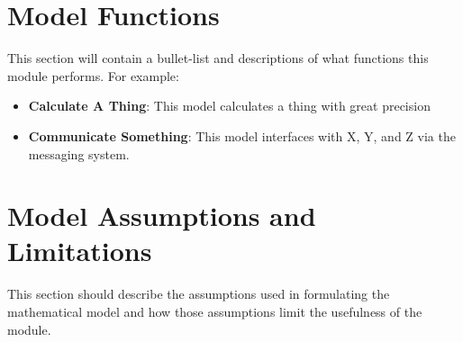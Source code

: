 

\section{Model Functions}
This section will contain a bullet-list and descriptions of what functions this module performs. For example:
\begin{itemize}
	\item \textbf{Calculate A Thing}: This model calculates a thing with great precision
	\item \textbf{Communicate Something}: This model interfaces with X, Y, and Z via the messaging system.
\end{itemize}

\section{Model Assumptions and Limitations}
This section should describe the assumptions used in formulating the mathematical model and how those assumptions limit the usefulness of the module.